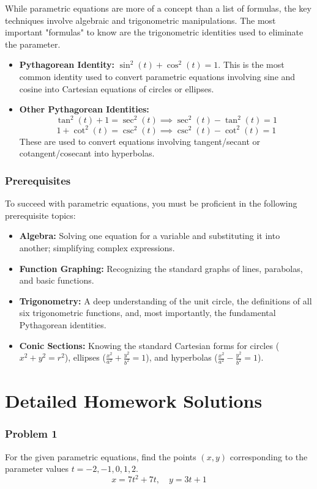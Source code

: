 \documentclass{article}
\begin{document}
While parametric equations are more of a concept than a list of formulas, the key techniques involve algebraic and trigonometric manipulations. The most important "formulas" to know are the trigonometric identities used to eliminate the parameter.
\begin{itemize}
    \item \textbf{Pythagorean Identity:} $\sin^2(t) + \cos^2(t) = 1$. This is the most common identity used to convert parametric equations involving sine and cosine into Cartesian equations of circles or ellipses.
    \item \textbf{Other Pythagorean Identities:}
    \[
    \tan^2(t) + 1 = \sec^2(t) \implies \sec^2(t) - \tan^2(t) = 1
    \]
    \[
    1 + \cot^2(t) = \csc^2(t) \implies \csc^2(t) - \cot^2(t) = 1
    \]
    These are used to convert equations involving tangent/secant or cotangent/cosecant into hyperbolas.
\end{itemize}

\section{Prerequisites}

To succeed with parametric equations, you must be proficient in the following prerequisite topics:
\begin{itemize}
    \item \textbf{Algebra:} Solving one equation for a variable and substituting it into another; simplifying complex expressions.
    \item \textbf{Function Graphing:} Recognizing the standard graphs of lines, parabolas, and basic functions.
    \item \textbf{Trigonometry:} A deep understanding of the unit circle, the definitions of all six trigonometric functions, and, most importantly, the fundamental Pythagorean identities.
    \item \textbf{Conic Sections:} Knowing the standard Cartesian forms for circles ($x^2+y^2=r^2$), ellipses ($\frac{x^2}{a^2} + \frac{y^2}{b^2} = 1$), and hyperbolas ($\frac{x^2}{a^2} - \frac{y^2}{b^2} = 1$).
\end{itemize}

\part*{Detailed Homework Solutions}

\section{Problem 1}
For the given parametric equations, find the points $(x, y)$ corresponding to the parameter values $t = -2, -1, 0, 1, 2$.
\[ x = 7t^2 + 7t, \quad y = 3t + 1 \]
\end{document}
